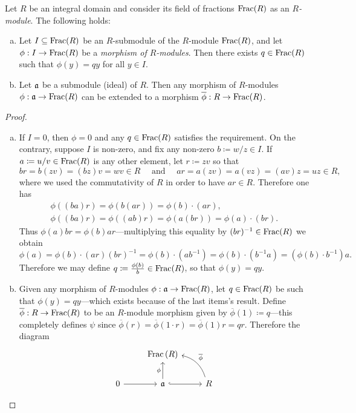 \begin{lemma}
\label{lemma:field-of-fractions-lifting-property}
Let \(R\) be an integral domain and consider its field of fractions
\(\operatorname{Frac}(R)\) as an \emph{\(R\)-module}. The following holds:
\begin{enumerate}[(a)]\setlength\itemsep{0em}
\item Let \(I \subseteq \operatorname{Frac}(R)\) be an \(R\)-submodule of the \(R\)-module
  \(\operatorname{Frac}(R)\), and let \(\phi: I \to \operatorname{Frac}(R)\) be a \emph{morphism of
    \(R\)-modules}. Then there exists \(q \in \operatorname{Frac}(R)\) such that
  \(\phi(y) = q y\) for all \(y \in I\).

\item Let \(\mathfrak{a}\) be a submodule (ideal) of \(R\). Then any morphism of
  \(R\)-modules \(\phi: \mathfrak{a} \to \operatorname{Frac}(R)\) can be extended to a morphism
  \(\overline{\phi}: R \to \operatorname{Frac}(R)\).
\end{enumerate}
\end{lemma}

\begin{proof}
\begin{enumerate}[(a)]\setlength\itemsep{0em}
\item If \(I = 0\), then \(\phi = 0\) and any \(q \in \operatorname{Frac}(R)\) satisfies the
  requirement. On the contrary, suppose \(I\) is non-zero, and fix any non-zero
  \(b \coloneq w/z \in I\). If \(a \coloneq u/v \in \operatorname{Frac}(R)\) is any other
  element, let \(r \coloneq z v\) so that
  \[
  b r = b (z v) = (b z) v = w v \in R
  \quad\text{ and }\quad
  a r = a(z v) = a(v z) = (a v) z = u z \in R,
  \]
  where we used the commutativity of \(R\) in order to have \(a r \in
  R\). Therefore one has
  \begin{gather*}
  \phi((b a) r) = \phi(b (a r)) = \phi(b) \cdot (a r), \\
  \phi((b a) r) = \phi((a b) r) = \phi(a (b r)) = \phi(a) \cdot (b r).
  \end{gather*}
  Thus \(\phi(a) b r = \phi(b) a r\)---multiplying this equality by
  \((b r)^{-1} \in \operatorname{Frac}(R)\) we obtain
  \[
  \phi(a)
  = \phi(b) \cdot (a r) (b r)^{-1}
  = \phi(b) \cdot (a b^{-1})
  = \phi(b) \cdot (b^{-1} a)
  = (\phi(b) \cdot b^{-1}) a.
  \]
  Therefore we may define \(q \coloneq \frac{\phi(b)}{b} \in \operatorname{Frac}(R)\), so that
  \(\phi(y) = q y\).

\item Given any morphism of \(R\)-modules \(\phi: \mathfrak{a} \to \operatorname{Frac}(R)\), let
  \(q \in \operatorname{Frac}(R)\) be such that \(\phi(y) = q y\)---which exists because of
  the last items's result. Define \(\overline{\phi}: R \to \operatorname{Frac}(R)\) to be an
  \(R\)-module morphism given by \(\overline{\phi}(1) \coloneq q\)---this
  completely defines \(\psi\) since
  \(\overline{\phi}(r) = \overline{\phi}(1 \cdot r) = \overline{\phi}(1) r = q
  r\). Therefore the diagram
  \[
  \begin{tikzcd}
  &\Frac{(R)} &
  \\
  0 \ar[r] &\ideal a \ar[r, hook] \ar[u, "\phi"]
  &R \ar[lu, bend right, "\overline{\phi}"']
  \end{tikzcd}
  \]
\end{enumerate}
\end{proof}

